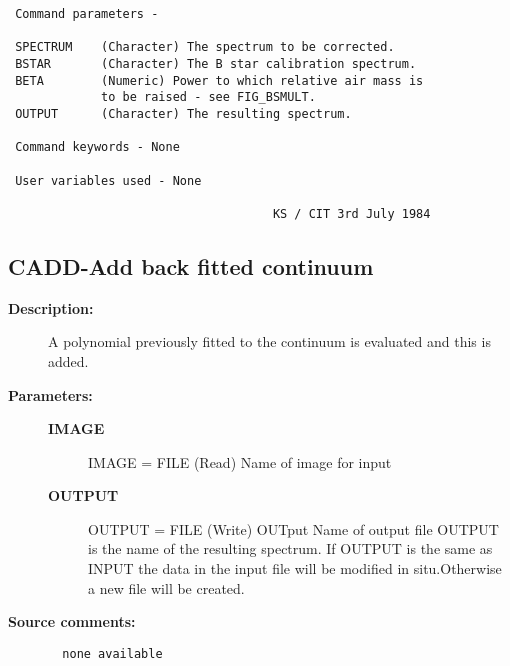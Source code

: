 \begin{description}
\begin{verbatim}
 Command parameters -

 SPECTRUM    (Character) The spectrum to be corrected.
 BSTAR       (Character) The B star calibration spectrum.
 BETA        (Numeric) Power to which relative air mass is
             to be raised - see FIG_BSMULT.
 OUTPUT      (Character) The resulting spectrum.

 Command keywords - None

 User variables used - None

                                     KS / CIT 3rd July 1984
\end{verbatim}
\end{description}
\subsection{CADD-\label{CADD}Add back fitted continuum}
\begin{description}

\item [{\bf Description:}]
  A polynomial previously fitted to the continuum is evaluated and
  this is added.

\item [{\bf Parameters:}]
\begin{description}
\item [{\bf IMAGE}]
    IMAGE = FILE (Read)
        Name of image for input
\item [{\bf OUTPUT}]
    OUTPUT = FILE (Write)
        OUTput Name of output file
        OUTPUT is the name of the resulting spectrum. If OUTPUT is the
        same as INPUT the data in the input file will be modified in
        situ.Otherwise a new file will be created.
\end{description}

\item [{\bf Source comments:}]
\begin{verbatim}
  none available

\end{verbatim}
\end{description}
